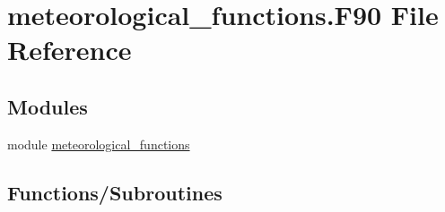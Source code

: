 \hypertarget{meteorological__functions_8_f90}{
\section{meteorological\_\-functions.F90 File Reference}
\label{meteorological__functions_8_f90}
}
\subsection*{Modules}
\begin{DoxyCompactItemize}
\item 
module \hyperlink{namespacemeteorological__functions}{meteorological\_\-functions}
\end{DoxyCompactItemize}
\subsection*{Functions/Subroutines}

